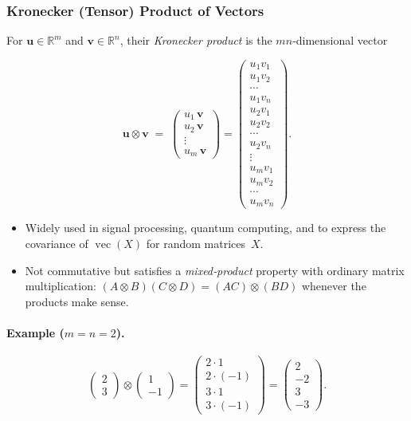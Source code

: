 \subsubsection{Kronecker (Tensor) Product of Vectors}
For $\mathbf{u}\in\mathbb{R}^{m}$ and $\mathbf{v}\in\mathbb{R}^{n}$,
their \emph{Kronecker product} is the $mn$‑dimensional vector

\[
  \mathbf{u}\otimes\mathbf{v}
  \;=\;
  \begin{pmatrix}
    u_1\,\mathbf{v} \\[2pt]
    u_2\,\mathbf{v} \\[1pt]
    \vdots \\[1pt]
    u_m\,\mathbf{v}
  \end{pmatrix}
  =
  \begin{pmatrix}
    u_1 v_1 \\ u_1 v_2 \\ \cdots \\ u_1 v_n \\
    u_2 v_1 \\ u_2 v_2 \\ \cdots \\ u_2 v_n \\
    \vdots \\  
    u_m v_1 \\ u_m v_2 \\ \cdots \\ u_m v_n
  \end{pmatrix}.
\]

\begin{itemize}
  \item Widely used in signal processing, quantum computing, and
        to express the covariance of $\operatorname{vec}(X)$ for random matrices~$X$.
  \item Not commutative but satisfies a \emph{mixed‑product} property  
        with ordinary matrix multiplication:  $(A\otimes B)(C\otimes D)=(AC)\otimes(BD)$
        whenever the products make sense.
\end{itemize}

\paragraph{Example ($m=n=2$).}
\[
\begin{pmatrix}2\\3\end{pmatrix}\!\otimes\!\begin{pmatrix}1\\-1\end{pmatrix}
=
\begin{pmatrix}
  2\cdot1 \\ 2\cdot(-1) \\ 3\cdot1 \\ 3\cdot(-1)
\end{pmatrix}
=
\begin{pmatrix}
  2 \\ -2 \\ 3 \\ -3
\end{pmatrix}.
\]

